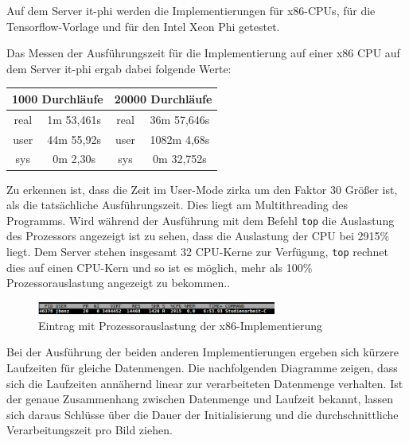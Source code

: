 \documentclass[../main.tex]{subfiles}
\begin{document}
Auf dem Server it-phi werden die Implementierungen für x86-CPUs, für die Tensorflow-Vorlage und für den Intel Xeon Phi getestet. 

Das Messen der Ausführungszeit für die Implementierung auf einer x86 CPU auf dem Server it-phi ergab dabei folgende Werte:\par

\begin{tabular}{|c|c||c|c|}
	\hline
	\multicolumn{2}{|c||}{1000 Durchläufe} & \multicolumn{2}{c|}{20000 Durchläufe} \\ \hline
	real & 1m 53,461s & real & 36m 57,646s\\ 
	\hline
	user & 44m 55,92s & user & 1082m 4,68s \\ 
	\hline
	sys & 0m 2,30s & sys & 0m 32,752s\\ 
	\hline
\end{tabular}

Zu erkennen ist, dass die Zeit im User-Mode zirka um den Faktor 30 Größer ist, als die tatsächliche Ausführungszeit.
Dies liegt am Multithreading des Programms. Wird während der Ausführung mit dem Befehl \texttt{top} die Auslastung des Prozessors angezeigt ist zu sehen, dass die Auslastung der CPU bei 2915\% liegt. Dem Server stehen insgesamt 32 CPU-Kerne zur Verfügung, \texttt{top} rechnet dies auf einen CPU-Kern und so ist es möglich, mehr als 100\% Prozessorauslastung angezeigt zu bekommen.. 
\begin{figure}[!htbp]
	\centering
	\includegraphics[width=0.7\textwidth]{../images/Benz/screenshot_top.png} %
	\caption{Eintrag mit Prozessorauslastung der x86-Implementierung} 
	\label{fig:conv_layer_seriell}
\end{figure}

Bei der Ausführung der beiden anderen Implementierungen ergeben sich kürzere Laufzeiten für gleiche Datenmengen. Die nachfolgenden Diagramme zeigen, dass sich die Laufzeiten annähernd linear zur verarbeiteten Datenmenge verhalten. Ist der genaue Zusammenhang zwischen Datenmenge und Laufzeit bekannt, lassen sich daraus Schlüsse über die Dauer der Initialisierung und die durchschnittliche Verarbeitungszeit pro Bild ziehen. 
\end{document}

